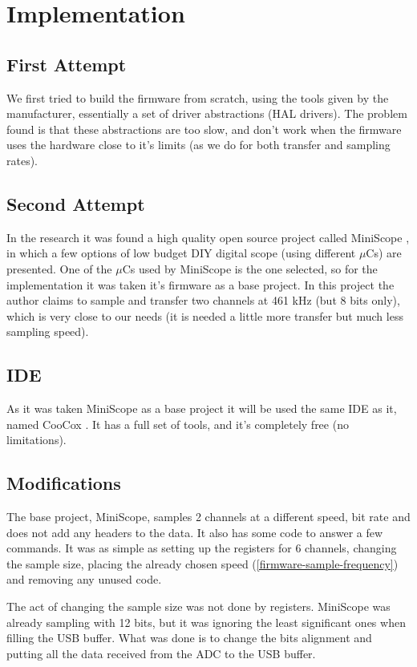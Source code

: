 \section{Implementation}
\label{firmware-implementation}

\subsection{First Attempt}
We first tried to build the firmware from scratch, using the tools given by the
manufacturer, essentially a set of driver abstractions (HAL drivers). The problem
found is that these abstractions are too slow, and don't work when the firmware
uses the hardware close to it's limits (as we do for both transfer and sampling rates).

\subsection{Second Attempt}
In the research it was found a high quality open source project called MiniScope \cite{MiniScope},
in which a few options of low budget DIY digital scope (using different $\mu$Cs) are
presented. One of the $\mu$Cs used by MiniScope is the one selected, so for the
implementation it was taken it's firmware as a base project. In this project the author
claims to sample and transfer two channels at 461 kHz (but 8 bits only), which is
very close to our needs (it is needed a little more transfer but much less sampling speed).

\subsection{IDE}
As it was taken MiniScope as a base project it will be used the same IDE as it, named
CooCox \cite{CooCox}. It has a full set of tools, and it's completely free (no limitations).

\subsection{Modifications}
The base project, MiniScope, samples 2 channels at a different speed, bit rate and does not
add any headers to the data. It also has some code to answer a few commands. It
was as simple as setting up the registers for 6 channels, changing the sample size,
placing the already chosen speed (\autoref{firmware-sample-frequency}) and removing
any unused code. 

The act of changing the sample size was not done by registers. MiniScope was already
sampling with 12 bits, but it was ignoring the least significant ones when filling
the USB buffer. What was done is to change the bits alignment and putting all
the data received from the ADC to the USB buffer.

